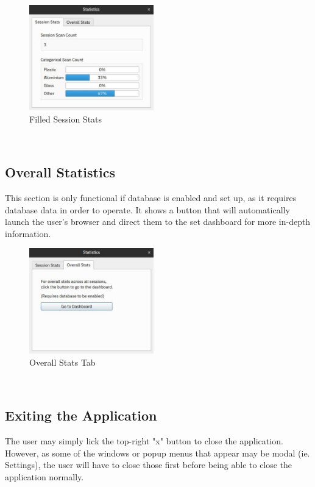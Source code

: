 \documentclass[conference]{IEEEtran}
\begin{document}
\begin{figure}[h]
    \centering
    \includegraphics[width=0.48\textwidth]{images/filled_session_stats.eps}
    \caption{Filled Session Stats}
\end{figure}~\\

\newpage
\subsection{Overall Statistics}
This section is only functional if database is enabled and set up, as it requires database data in order to operate. It shows a button that will automatically launch the user's browser and direct them to the set dashboard for more in-depth information.~\\

\begin{figure}[h]
    \centering
    \includegraphics[width=0.48\textwidth]{images/stats_overall.eps}
    \caption{Overall Stats Tab}
\end{figure}~\\

\subsection{Exiting the Application}
The user may simply lick the top-right "x" button to close the application. However, as some of the windows or popup menus that appear may be modal (ie. Settings), the user will have to close those first before being able to close the application normally.~\\
\end{document}
